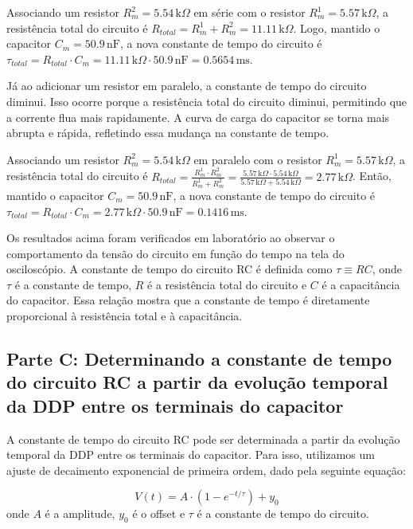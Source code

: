 \documentclass[12pt, a4paper]{article}
\begin{document}
    Associando um resistor \(R_m^2= 5.54 \, \text{k}\Omega\) em série com o resistor \(R_m^1 = 5.57 \, \text{k}\Omega\), a resistência total do circuito é \(R_{total} = R_m^1 + R_m^2 = 11.11 \, \text{k}\Omega\). Logo, mantido o capacitor \(C_m = 50.9 \, \text{nF}\), a nova constante de tempo do circuito é \(\tau_{total} = R_{total} \cdot C_m = 11.11 \, \text{k}\Omega \cdot 50.9 \, \text{nF} = 0.5654 \, \text{ms}\).
    
    Já ao adicionar um resistor em paralelo, a constante de tempo do circuito diminui. Isso ocorre porque a resistência total do circuito diminui, permitindo que a corrente flua mais rapidamente. A curva de carga do capacitor se torna mais abrupta e rápida, refletindo essa mudança na constante de tempo.

    Associando um resistor \(R_m^2 = 5.54 \, \text{k}\Omega\) em paralelo com o resistor \(R_m^1 = 5.57 \, \text{k}\Omega\), a resistência total do circuito é \(R_{total} = \frac{R_m^1 \cdot R_m^2}{R_m^1 + R_m^2} = \frac{5.57 \, \text{k}\Omega \cdot 5.54 \, \text{k}\Omega}{5.57 \, \text{k}\Omega + 5.54 \, \text{k}\Omega} = 2.77 \, \text{k}\Omega\). Então, mantido o capacitor \(C_m = 50.9 \, \text{nF}\), a nova constante de tempo do circuito é \(\tau_{total} = R_{total} \cdot C_m = 2.77 \, \text{k}\Omega \cdot 50.9 \, \text{nF} = 0.1416 \, \text{ms}\).

    Os resultados acima foram verificados em laboratório ao observar o comportamento da tensão do circuito em função do tempo na tela do osciloscópio. A constante de tempo do circuito RC é definida como $\tau\equiv R C$, onde $\tau$ é a constante de tempo, $R$ é a resistência total do circuito e $C$ é a capacitância do capacitor. Essa relação mostra que a constante de tempo é diretamente proporcional à resistência total e à capacitância.
    
\subsection*{Parte C: Determinando a constante de tempo do circuito RC a partir da evolução temporal da DDP entre os terminais do capacitor}

    A constante de tempo do circuito RC pode ser determinada a partir da evolução temporal da DDP entre os terminais do capacitor. Para isso, utilizamos um ajuste de decaimento exponencial de primeira ordem, dado pela seguinte equação:
    
    \begin{equation}
        V(t) = A \cdot (1 - e^{-t/\tau}) + y_0
    \end{equation}
    onde \(A\) é a amplitude, \(y_0\) é o offset e \(\tau\) é a constante de tempo do circuito.
    
\end{document}
